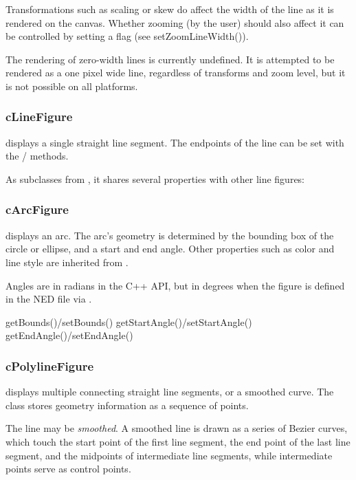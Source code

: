 Transformations such as scaling or skew do affect the width of the line as it
is rendered on the canvas. Whether zooming (by the user) should also affect
it can be controlled by setting a flag (see setZoomLineWidth()).

The rendering of zero-width lines is currently undefined. It is attempted
to be rendered as a one pixel wide line, regardless of transforms and zoom
level, but it is not possible on all platforms.

\subsubsection{cLineFigure}

 displays a single straight line segment. The endpoints
of the line can be set with the / methods.

As  subclasses from , it
shares several properties with other line figures:

\subsubsection{cArcFigure}

 displays an arc. The arc's geometry is determined by
the bounding box of the circle or ellipse, and a start and end angle. Other
properties such as color and line style are inherited from
.

\begin{note}
Angles are in radians in the C++ API, but in degrees when the figure is
defined in the NED file via .
\end{note}

getBounds()/setBounds()
getStartAngle()/setStartAngle()
getEndAngle()/setEndAngle()

\subsubsection{cPolylineFigure}

 displays multiple connecting straight line
segments, or a smoothed curve. The class stores geometry information as a
sequence of points.

The line may be \textit{smoothed}. A smoothed line is drawn
as a series of Bezier curves, which touch the start point of the first
line segment, the end point of the last line segment, and the midpoints
of intermediate line segments, while intermediate points serve as control
points.

